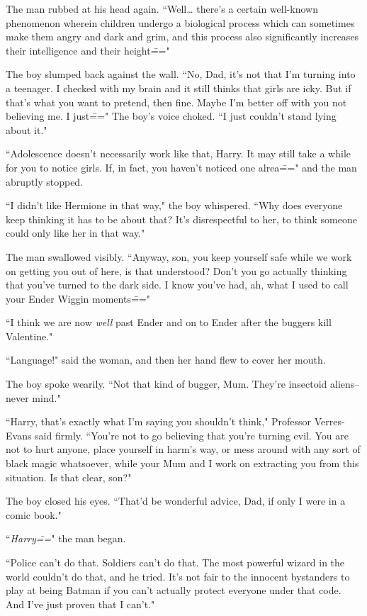 The man rubbed at his head again. ``Well{\ldots} there's a certain well-known phenomenon wherein children undergo a biological process which can sometimes make them angry and dark and grim, and this process also significantly increases their intelligence and their height\==="

The boy slumped back against the wall. ``No, Dad, it's not that I'm turning into a teenager. I checked with my brain and it still thinks that girls are icky. But if that's what you want to pretend, then fine. Maybe I'm better off with you not believing me. I just\===" The boy's voice choked. ``I just couldn't stand lying about it."

``Adolescence doesn't necessarily work like that, Harry. It may still take a while for you to notice girls. If, in fact, you haven't noticed one alrea\===" and the man abruptly stopped.

``I didn't like Hermione in that way," the boy whispered. ``Why does everyone keep thinking it has to be about that? It's disrespectful to her, to think someone could only like her in that way."

The man swallowed visibly. ``Anyway, son, you keep yourself safe while we work on getting you out of here, is that understood? Don't you go actually thinking that you've turned to the dark side. I know you've had, ah, what I used to call your Ender Wiggin moments\==="

``I think we are now \emph{well} past Ender and on to Ender after the buggers kill Valentine."

``Language!" said the woman, and then her hand flew to cover her mouth.

The boy spoke wearily. ``Not that kind of bugger, Mum. They're insectoid aliens\---never mind."

``Harry, that's exactly what I'm saying you shouldn't think," Professor Verres-Evans said firmly. ``You're not to go believing that you're turning evil. You are not to hurt anyone, place yourself in harm's way, or mess around with any sort of black magic whatsoever, while your Mum and I work on extracting you from this situation. Is that clear, son?"

The boy closed his eyes. ``That'd be wonderful advice, Dad, if only I were in a comic book."

``\emph{Harry\===}" the man began.

``Police can't do that. Soldiers can't do that. The most powerful wizard in the world couldn't do that, and he tried. It's not fair to the innocent bystanders to play at being Batman if you can't actually protect everyone under that code. And I've just proven that I can't."

